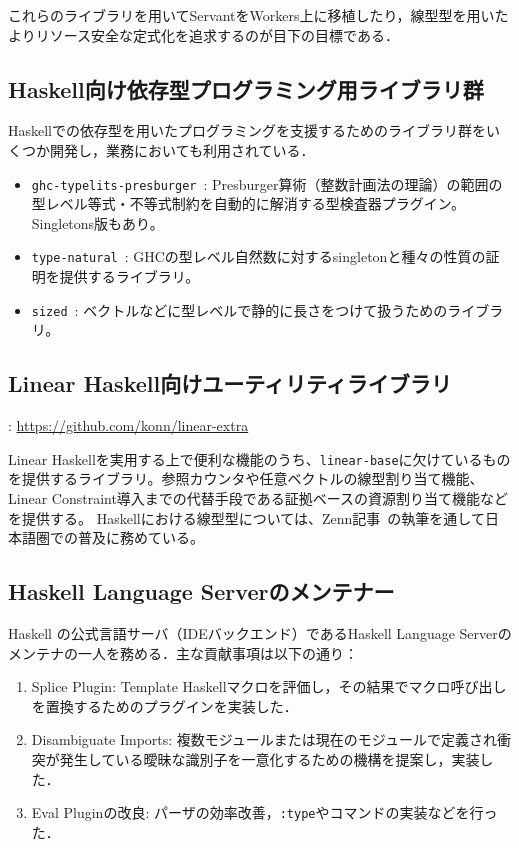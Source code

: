 \documentclass[a4j,draft]{ltjsarticle}
\renewcommand{\emph}[1]{\textbf{\textgt{#1}}}
\begin{document}
\begin{refsection}
これらのライブラリを用いてServantをWorkers上に移植したり，線型型を用いたよりリソース安全な定式化を追求するのが目下の目標である．

\subsection*{Haskell向け依存型プログラミング用ライブラリ群}
Haskellでの依存型を用いたプログラミングを支援するためのライブラリ群をいくつか開発し，業務においても利用されている．

\begin{itemize}
  \item \texttt{ghc-typelits-presburger}~\cite{ghc-typelits-presburger}: Presburger算術（整数計画法の理論）の範囲の型レベル等式・不等式制約を自動的に解消する型検査器プラグイン。Singletons版もあり。
  \item \texttt{type-natural}~\cite{type-natural}: GHCの型レベル自然数に対するsingletonと種々の性質の証明を提供するライブラリ。
  \item \texttt{sized}~\cite{sized}: ベクトルなどに型レベルで静的に長さをつけて扱うためのライブラリ。
\end{itemize}

\subsection*{Linear Haskell向けユーティリティライブラリ}
\vspace{-1em}
\noindent
\emph{URL}: \url{https://github.com/konn/linear-extra}
\vspace{1em}

Linear Haskellを実用する上で便利な機能のうち、\texttt{linear-base}に欠けているものを提供するライブラリ。参照カウンタや任意ベクトルの線型割り当て機能、Linear Constraint導入までの代替手段である証拠ベースの資源割り当て機能などを提供する。
Haskellにおける線型型については、Zenn記事~\cite{ISHII:2023lh1,ISHII:2023lh2}の執筆を通して日本語圏での普及に務めている。

\subsection*{Haskell Language Serverのメンテナー}
Haskell の公式言語サーバ（IDEバックエンド）であるHaskell Language Serverのメンテナの一人を務める．主な貢献事項は以下の通り：
  \begin{enumerate}
    \item Splice Plugin: Template Haskellマクロを評価し，その結果でマクロ呼び出しを置換するためのプラグインを実装した．
    \item Disambiguate Imports: 複数モジュールまたは現在のモジュールで定義され衝突が発生している曖昧な識別子を一意化するための機構を提案し，実装した．
    \item Eval Pluginの改良: パーザの効率改善，\texttt{:type}やコマンドの実装などを行った．
  \end{enumerate}


\end{refsection}
\end{document}
